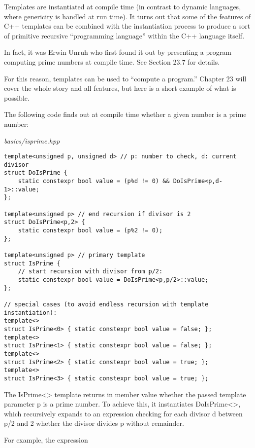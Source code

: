Templates are instantiated at compile time (in contrast to dynamic languages, where genericity is handled at run time). It turns out that some of the features of C++ templates can be combined with the instantiation process to produce a sort of primitive recursive “programming language” within the C++ language itself.

\begin{tcolorbox}[colback=webgreen!5!white,colframe=webgreen!75!black]
\hspace*{0.75cm}In fact, it was Erwin Unruh who first found it out by presenting a program computing prime numbers at compile time. See Section 23.7 for details.
\end{tcolorbox}

For this reason, templates can be used to “compute a program.” Chapter 23 will cover the whole story and all features, but here is a short example of what is possible.

The following code finds out at compile time whether a given number is a prime number:

\noindent
\textit{basics/isprime.hpp}
\begin{lstlisting}[style=styleCXX]
template<unsigned p, unsigned d> // p: number to check, d: current divisor
struct DoIsPrime {
	static constexpr bool value = (p%d != 0) && DoIsPrime<p,d-1>::value;
};

template<unsigned p> // end recursion if divisor is 2
struct DoIsPrime<p,2> {
	static constexpr bool value = (p%2 != 0);
};

template<unsigned p> // primary template
struct IsPrime {
	// start recursion with divisor from p/2:
	static constexpr bool value = DoIsPrime<p,p/2>::value;
};

// special cases (to avoid endless recursion with template instantiation):
template<>
struct IsPrime<0> { static constexpr bool value = false; };
template<>
struct IsPrime<1> { static constexpr bool value = false; };
template<>
struct IsPrime<2> { static constexpr bool value = true; };
template<>
struct IsPrime<3> { static constexpr bool value = true; };
\end{lstlisting}

The IsPrime<> template returns in member value whether the passed template parameter p is a prime number. To achieve this, it instantiates DoIsPrime<>, which recursively expands to an expression checking for each divisor d between p/2 and 2 whether the divisor divides p without remainder.

For example, the expression

